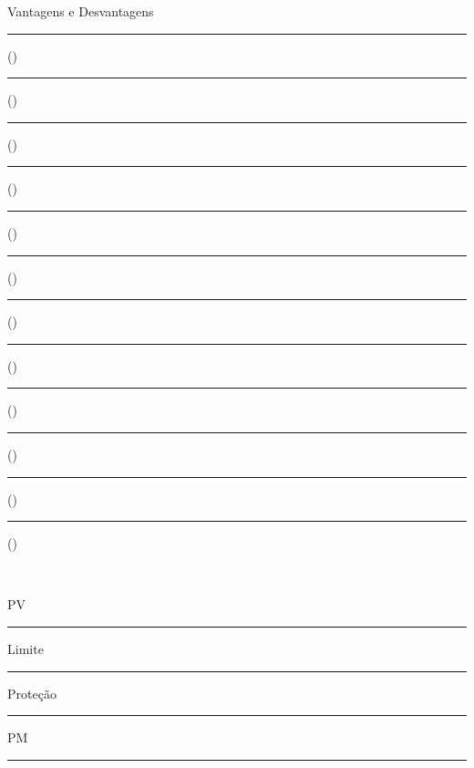 \documentclass[a4paper,12pt]{article}
\begin{document}
	\begin{minipage}[t][][t]{.49\linewidth}
		{\centering Vantagens e Desvantagens \\[\baselineskip]}
		
		\vspace{.18cm}
		\rule{.4\linewidth}{.5pt}(\hspace{.05\linewidth}) \rule{.4\linewidth}{.5pt}(\hspace{.05\linewidth}) \\
		\rule{.4\linewidth}{.5pt}(\hspace{.05\linewidth}) \rule{.4\linewidth}{.5pt}(\hspace{.05\linewidth}) \\
		\rule{.4\linewidth}{.5pt}(\hspace{.05\linewidth}) \rule{.4\linewidth}{.5pt}(\hspace{.05\linewidth}) \\
		\rule{.4\linewidth}{.5pt}(\hspace{.05\linewidth}) \rule{.4\linewidth}{.5pt}(\hspace{.05\linewidth}) \\
		\rule{.4\linewidth}{.5pt}(\hspace{.05\linewidth}) \rule{.4\linewidth}{.5pt}(\hspace{.05\linewidth}) \\
		\rule{.4\linewidth}{.5pt}(\hspace{.05\linewidth}) \rule{.4\linewidth}{.5pt}(\hspace{.05\linewidth}) \\
	\end{minipage} \\

	\begin{minipage}{\linewidth}
		\begin{minipage}{.49\linewidth}
			\Sagittarius \hspace{3pt} PV \rule{20pt}{.5pt}%
			\hspace{3pt}%
			Limite \rule{20pt}{.5pt}%
			\hspace{3pt}%
			Proteção \rule{20pt}{.5pt}%
			\hspace{3pt}%
		\end{minipage}%
		\hspace{.02\linewidth}%
		\begin{minipage}{.49\linewidth}
		\begin{flushleft}
			\Leo \hspace{3pt} PM \rule{20pt}{.5pt}
		\end{flushleft}
		\end{minipage}
	\end{minipage} \\
	
\end{document}
